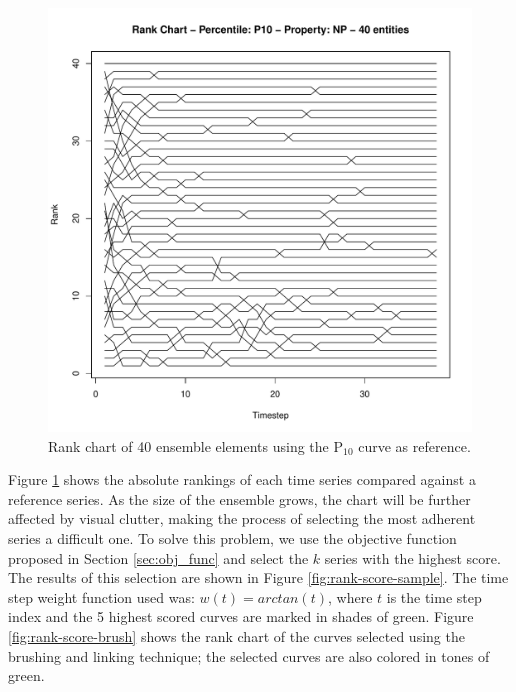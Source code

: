 \documentclass[final,5p,times,twocolumn]{elsarticle}
\begin{document}
\begin{figure}[H]
  \includegraphics[width=\columnwidth]{rank-sample-40.pdf}
  \caption{Rank chart of 40 ensemble elements using the P$_{10}$ curve as reference.}
  \label{fig:rank-sample}
\end{figure}

Figure \ref{fig:rank-sample} shows the absolute rankings of each time series compared against a reference series. As the size of the ensemble grows, the chart will be further affected by visual clutter, making the process of selecting the most adherent series a difficult one. To solve this problem, we use the objective function proposed in Section \ref{sec:obj_func} and select the $k$ series with the highest score. The results of this selection are shown in Figure \ref{fig:rank-score-sample}. The time step weight function used was: $w(t) = arctan(t)$, where $t$ is the time step index and the 5 highest scored curves are marked in shades of green. Figure \ref{fig:rank-score-brush} shows the rank chart of the curves selected using the brushing and linking technique; the selected curves are also colored in tones of green.

\end{document}
